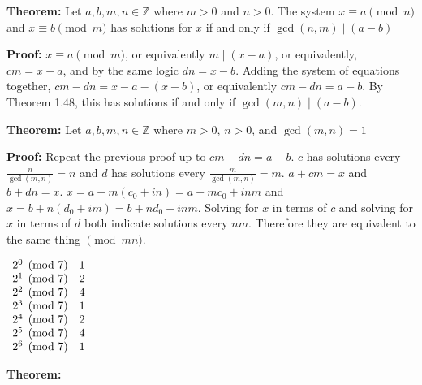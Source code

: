 \item \textbf{Theorem:} Let \(a, b, m, n \in \mathbb Z\) where \(m > 0\) and \(n > 0\). The system \(x \equiv a \pmod n\) and \(x \equiv b \pmod m\) has solutions for \(x\) if and only if \(\gcd(n, m) \mid (a - b)\)

\textbf{Proof:} \(x \equiv a \pmod m\), or equivalently \(m \mid (x-a)\), or equivalently, \(cm = x - a\), and by the same logic \(dn = x - b\). Adding the system of equations together, \(cm - dn = x - a - (x - b)\), or equivalently \(cm - dn = a - b\). By Theorem 1.48, this has solutions if and only if \(\gcd(m, n) \mid (a - b)\).

\item \textbf{Theorem:} Let \(a, b, m, n \in \mathbb Z\) where \(m > 0\), \(n > 0\), and \(\gcd(m, n) = 1\)

\textbf{Proof:} Repeat the previous proof up to \(cm - dn = a - b\).  \(c\) has solutions every \(\frac{n}{\gcd(m, n)} = n\) and \(d\) has solutions every \(\frac{m}{\gcd(m, n)} = m\). \(a + cm = x\) and \(b + dn = x\). \(x = a + m(c_0 + in) = a + m c_0 + inm\) and \(x = b + n(d_0 + im) = b + nd_0 + inm\). Solving for \(x\) in terms of \(c\) and solving for \(x\) in terms of \(d\) both indicate solutions every \(nm\). Therefore they are equivalent to the same thing \(\pmod{mn}\).


\setcounter{enumi}{4}
\setcounter{enumii}{0}

\item 
\(
\begin{array}[t]{ll}
2^0 \pmod 7 & 1 \\
2^1 \pmod 7 & 2 \\
2^2 \pmod 7 & 4 \\
2^3 \pmod 7 & 1 \\
2^4 \pmod 7 & 2 \\
2^5 \pmod 7 & 4 \\
2^6 \pmod 7 & 1 \\

\end{array}
\)

\item \textbf{Theorem:} \(\)

